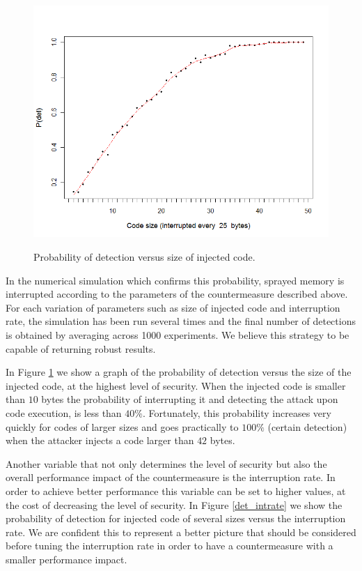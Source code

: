 \begin{figure}[htbp] 
\begin{center}
\includegraphics[scale=0.5]{images/bubble_det_codesize}
\caption{{Probability of detection versus size of injected code.}}
\vspace{0.3cm}
\label{det_codesize}
\end{center}
\end{figure}


In the numerical simulation which confirms this probability, sprayed memory is interrupted according to the parameters of the countermeasure described above. For each variation of parameters such as size of injected code and interruption rate, the simulation has been run several times and the final number of detections is obtained by averaging across 1000 experiments. We believe this strategy to be capable of returning robust results.

In Figure \ref{det_codesize} we show a graph of the probability of detection versus the size of the injected code, at the highest level of security. When the injected code is smaller than $10$ bytes the probability of interrupting it and detecting the attack upon code execution, is less than $40\%$.
Fortunately, this probability increases very quickly for codes of larger sizes and goes practically to $100\%$ (certain detection) when the attacker injects a code larger than $42$ bytes.  

Another variable that not only determines the level of security but also the overall performance impact of the countermeasure is the interruption rate. In order to achieve better performance this variable can be set to higher values, at the cost of decreasing the level of security. In Figure \ref{det_intrate} we show the probability of detection for injected code of several sizes versus the interruption rate. We are confident this to represent a better picture that should be considered before tuning the interruption rate in order to have a countermeasure with a smaller performance impact.


